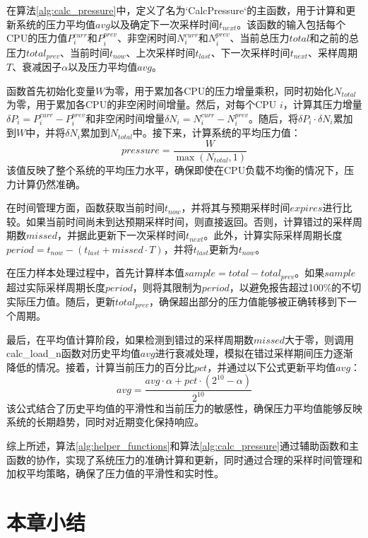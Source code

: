 在算法\ref{alg:calc_pressure}中，定义了名为`CalcPressure`的主函数，用于计算和更新系统的压力平均值$avg$以及确定下一次采样时间$t_{next}$。该函数的输入包括每个CPU的压力值$P_i^{curr}$和$P_i^{prev}$、非空闲时间$N_i^{curr}$和$N_i^{prev}$、当前总压力$total$和之前的总压力$total_{prev}$、当前时间$t_{now}$、上次采样时间$t_{last}$、下一次采样时间$t_{next}$、采样周期$T$、衰减因子$\alpha$以及压力平均值$avg$。

函数首先初始化变量$W$为零，用于累加各CPU的压力增量乘积，同时初始化$N_{total}$为零，用于累加各CPU的非空闲时间增量。然后，对每个CPU $i$，计算其压力增量$\delta P_i = P_i^{curr} - P_i^{prev}$和非空闲时间增量$\delta N_i = N_i^{curr} - N_i^{prev}$。随后，将$\delta P_i \cdot \delta N_i$累加到$W$中，并将$\delta N_i$累加到$N_{total}$中。接下来，计算系统的平均压力值：
\[
pressure = \frac{W}{\max(N_{total}, 1)}
\]
该值反映了整个系统的平均压力水平，确保即使在CPU负载不均衡的情况下，压力计算仍然准确。

在时间管理方面，函数获取当前时间$t_{now}$，并将其与预期采样时间$expires$进行比较。如果当前时间尚未到达预期采样时间，则直接返回。否则，计算错过的采样周期数$missed$，并据此更新下一次采样时间$t_{next}$。此外，计算实际采样周期长度$period = t_{now} - (t_{last} + missed \cdot T)$，并将$t_{last}$更新为$t_{now}$。

在压力样本处理过程中，首先计算样本值$sample = total - total_{prev}$。如果$sample$超过实际采样周期长度$period$，则将其限制为$period$，以避免报告超过100\%的不切实际压力值。随后，更新$total_{prev}$，确保超出部分的压力值能够被正确转移到下一个周期。

最后，在平均值计算阶段，如果检测到错过的采样周期数$missed$大于零，则调用calc\_load\_n函数对历史平均值$avg$进行衰减处理，模拟在错过采样期间压力逐渐降低的情况。接着，计算当前压力的百分比$pct$，并通过以下公式更新平均值$avg$：
\[
avg = \frac{avg \cdot \alpha + pct \cdot (2^{10} - \alpha)}{2^{10}}
\]
该公式结合了历史平均值的平滑性和当前压力的敏感性，确保压力平均值能够反映系统的长期趋势，同时对近期变化保持响应。

综上所述，算法\ref{alg:helper_functions}和算法\ref{alg:calc_pressure}通过辅助函数和主函数的协作，实现了系统压力的准确计算和更新，同时通过合理的采样时间管理和加权平均策略，确保了压力值的平滑性和实时性。


\section{本章小结}